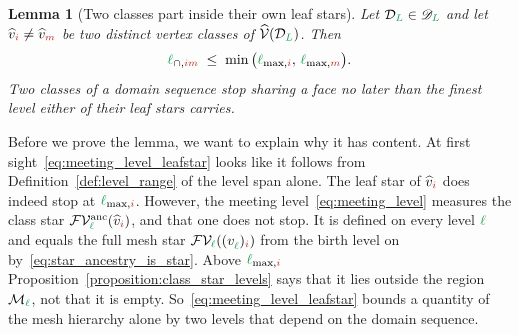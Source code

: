 \documentclass[a4paper, 12pt]{article}
\makeatletter
\newcommand{\lmaxIdx}[1]{\l_{\max,#1}}
\newcommand{\lmeetIdx}[2]{\l_{\cap,#1#2}}
\newcommand{\green}{\color{ForestGreen}}
\newcommand{\brickred}{\color{BrickRed}}
\newcommand{\V}{\mathcal{V}}
\newcommand{\F}{\mathcal{F}}
\newcommand{\vertex}[2]{\freeQ{v}{}{#1}{#2}}
\newcommand{\vertexClass}[1]{\widehat{v}_{#1}}
\newcommand{\vertexClasses}{\widehat{\V}}
\newcommand{\FVl}[1]{\F\V_{#1}}
\newcommand{\coarseIdxone}{{\brickred i}}
\newcommand{\coarseIdxtwo}{{\brickred m}}
\renewcommand{\l}{{\green\ell}}
\renewcommand{\L}{{\green L}}
\newcommand{\freeQ}[4]{ ( {#1}^{#2}_{#3} )_{#4}}
\newcommand{\M}{\mathcal{M}}
\newtheorem{lemma}[theorem]{Lemma}
\theoremstyle{definition}
\theoremstyle{plain}
\numberwithin{equation}{section}
\DeclareRobustCommand{\domseq}[1][]{\mathcal{D}\ifx\@empty#1\@empty\else_{#1}\fi}
\newcommand{\alldomseqs}{\mathscr{D}}
\newcommand{\FVanc}[1]{\F\V^{\mathrm{anc}}_{#1}}            %
\makeatother
\begin{document}
\begin{lemma}[Two classes part inside their own leaf stars]
    \label{lemma:meeting_level_leafstar}
    Let $\domseq[\L] \in \alldomseqs_\L$ and let $\vertexClass{\coarseIdxone} \neq \vertexClass{\coarseIdxtwo}$ be two distinct vertex classes of $\vertexClasses(\domseq[\L])$. Then
    \begin{equation}
        \label{eq:meeting_level_leafstar}
        \lmeetIdx{\coarseIdxone}{\coarseIdxtwo} \; \leq \; \min \big( \lmaxIdx{\coarseIdxone}, \, \lmaxIdx{\coarseIdxtwo} \big).
    \end{equation}
    Two classes of a domain sequence stop sharing a face no later than the finest level either of their leaf stars carries.
\end{lemma}

Before we prove the lemma, we want to explain why it has content. At first sight~\eqref{eq:meeting_level_leafstar} looks like it follows from Definition~\ref{def:level_range} of the level span alone. The leaf star of $\vertexClass{\coarseIdxone}$ does indeed stop at $\lmaxIdx{\coarseIdxone}$. However, the meeting level~\eqref{eq:meeting_level} measures the class star $\FVanc{\l}(\vertexClass{\coarseIdxone})$, and that one does not stop. It is defined on every level $\l$ and equals the full mesh star $\FVl{\l}(\vertex{\l}{\coarseIdxone})$ from the birth level on by~\eqref{eq:star_ancestry_is_star}. Above $\lmaxIdx{\coarseIdxone}$ Proposition~\ref{proposition:class_star_levels} says that it lies outside the region $\M_\l$, not that it is empty. So~\eqref{eq:meeting_level_leafstar} bounds a quantity of the mesh hierarchy alone by two levels that depend on the domain sequence.
\end{document}
